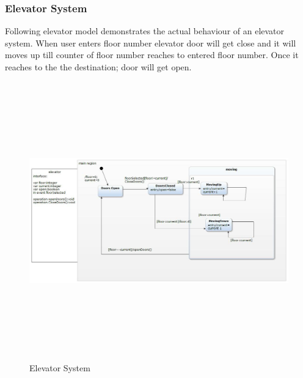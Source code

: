 \documentclass[a4paper,12pt,oneside]{article}
\begin{document}
\subsubsection{Elevator System}
Following elevator model demonstrates the actual behaviour of an elevator system. When user enters floor number elevator door will get close and it will moves up till counter of floor number reaches to entered floor number. Once it reaches to the the destination; door will get open.

\begin{figure}[H]
\centering
\includegraphics[width=15cm,height=12cm]{elevator.jpg}
\caption{Elevator System}
\end{figure}

\newpage
\end{document}
